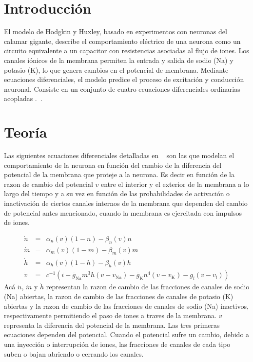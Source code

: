 \documentclass[aps,prl,twocolumn,groupedaddress]{revtex4-2}
\begin{document}
\section{Introducción}

El modelo de Hodgkin y Huxley, basado en experimentos con neuronas del calamar gigante, describe el comportamiento eléctrico de una neurona como un circuito equivalente a un capacitor con resistencias asociadas al flujo de iones. Los canales iónicos de la membrana permiten la entrada y salida de sodio (Na) y potasio (K), lo que genera cambios en el potencial de membrana. Mediante ecuaciones diferenciales, el modelo predice el proceso de excitación y conducción neuronal.
Consiste en un conjunto de cuatro ecuaciones diferenciales ordinarias acopladas .~\cite{HodgkinyHuxleyWikipedia}.

\section{Teoría}

Las siguientes ecuaciones diferenciales
detalladas en ~\cite{HodgkinyHuxleyWikipedia}
son las que modelan el comportamiento de la neurona en función del cambio de la diferencia del potencial de la membrana que proteje a la neurona. Es decir en función de la razon de cambio del potencial $v$ entre el interior y el exterior de la membrana a lo largo del tiempo y a su vez en función de las probabilidades de activación o inactivación de ciertos canales internos de la membrana  que dependen del cambio de potencial antes mencionado, cuando la membrana es ejercitada con impulsos de iones.

\begin{eqnarray*}
\dot{n}&=&\alpha_n(v)(1-n)-\beta_n(v) n\\
\dot{m}&=&\alpha_m(v)(1-m)-\beta_m(v) m\\
\dot{h}&=&\alpha_h(v)(1-h)-\beta_h(v) h\\
\dot{v}&=&c^{-1}(i-\bar{g}_{\mathrm{Na}}m^3h(v-v_{\mathrm{Na}})-\bar{g}_{\mathrm{K}}n^4(v-v_{\mathrm{K}})-g_{l}(v-v_{l}))
\end{eqnarray*}
Acá $\dot{n}$, $\dot{m}$ y $\dot{h}$
representan la razon de cambio de las fracciones de canales de sodio (Na) abiertas, la razon de cambio de las fracciones de canales de potasio (K) abiertas y la razon de cambio de las fracciones de canales de sodio (Na) inactivos, respectivamente permitiendo el paso de iones a traves de la membrana. $\dot{v}$ representa la diferencia del potencial de la membrana.
Las tres primeras ecuaciones dependen del potencial. Cuando el potencial sufre un cambio, debido a una inyección o interrupción de iones, las fracciones de canales de cada tipo suben o bajan abriendo o cerrando los canales.
\end{document}
